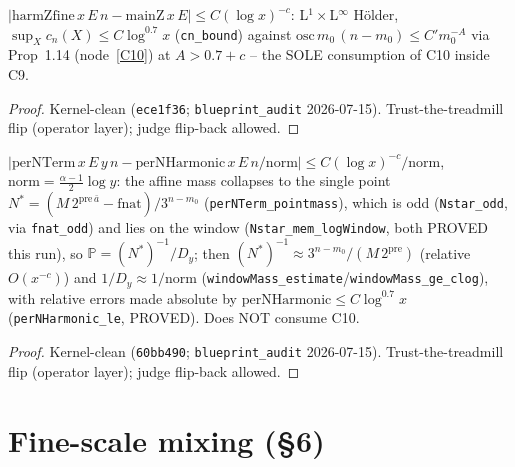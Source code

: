 \begin{lemma}\label{C9B2}
  \leanok
\(|\mathrm{harmZfine}\,x\,E\,n - \mathrm{mainZ}\,x\,E| \le C(\log x)^{-c}\):
L\(^1\times\)L\(^\infty\) H\"older, \(\sup_X c_n(X) \le C\log^{0.7}x\) (\texttt{cn\_bound})
against \(\mathrm{osc}\,m_0\,(n-m_0) \le C' m_0^{-A}\) via Prop~1.14 (node~\ref{C10}) at
\(A > 0.7 + c\) -- the SOLE consumption of C10 inside C9.
\end{lemma}
\begin{proof}
  \leanok
  Kernel-clean (\texttt{ece1f36}; \texttt{blueprint\_audit} 2026-07-15).  Trust-the-treadmill
  flip (operator layer); judge flip-back allowed.
\end{proof}

\begin{lemma}\label{C9A}
  \leanok
\(|\mathrm{perNTerm}\,x\,E\,y\,n - \mathrm{perNHarmonic}\,x\,E\,n/\mathrm{norm}| \le
C(\log x)^{-c}/\mathrm{norm}\), \(\mathrm{norm} = \tfrac{\alpha-1}{2}\log y\): the affine mass
collapses to the single point \(N^* = (M\,2^{\mathrm{pre}\,\bar a} - \mathrm{fnat})/3^{n-m_0}\)
(\texttt{perNTerm\_pointmass}), which is odd (\texttt{Nstar\_odd}, via \texttt{fnat\_odd}) and
lies on the window (\texttt{Nstar\_mem\_logWindow}, both PROVED this run), so
\(\mathbb{P} = (N^*)^{-1}/D_y\); then \((N^*)^{-1} \approx 3^{n-m_0}/(M\,2^{\mathrm{pre}})\)
(relative \(O(x^{-c})\)) and \(1/D_y \approx 1/\mathrm{norm}\)
(\texttt{windowMass\_estimate}/\texttt{windowMass\_ge\_clog}), with relative errors made
absolute by \(\mathrm{perNHarmonic} \le C\log^{0.7}x\) (\texttt{perNHarmonic\_le}, PROVED).
Does NOT consume C10.
\end{lemma}
\begin{proof}
  \leanok
  Kernel-clean (\texttt{60bb490}; \texttt{blueprint\_audit} 2026-07-15).  Trust-the-treadmill
  flip (operator layer); judge flip-back allowed.
\end{proof}


\chapter{Fine-scale mixing (§6)}\label{chp:mixing}

